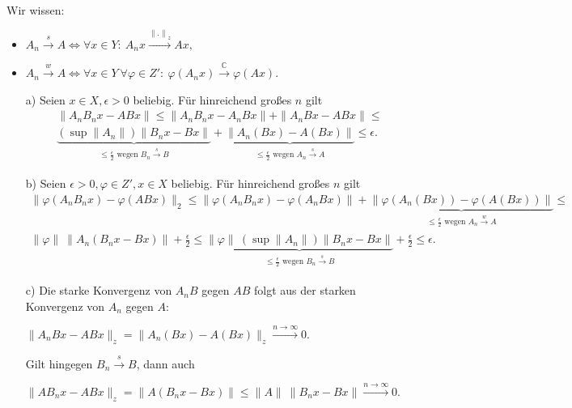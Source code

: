 \begin{solution}
\leavevmode \\
  Wir wissen:
\begin{itemize}
    \item $A_n \xrightarrow{s} A \Leftrightarrow \forall x \in Y:~ A_nx \xrightarrow{\mathbb{ \| . \|}_z} Ax,$
    \item $A_n \xrightarrow{w} A \Leftrightarrow \forall x \in Y~ \forall \varphi \in Z':~ \varphi(A_nx) \xrightarrow{\mathbb{C}} \varphi(Ax)$.
\end{itemize}

\begin{itemize}
    \item [a)] Seien $x \in X, \epsilon > 0$ beliebig. Für hinreichend großes $n$ gilt
    \begin{align*}
        \| A_n B_n x - ABx \| \leq \| A_n B_n x - A_n Bx \| + \| A_n Bx - ABx \| \leq \\
        \underbrace{(\sup{\| A_n \|}) \| B_n x - Bx \|}_{\substack{\leq
        \frac{\epsilon}{2}
        \text{~wegen~} B_n \xrightarrow{s} B}} +
        \underbrace{\| A_n(Bx) - A(Bx) \|}_{\substack{\leq \frac{\epsilon}{2} \text{~wegen~} A_n \xrightarrow{s} A}}
        \leq \epsilon.
    \end{align*}

    \item [b)] Seien $\epsilon > 0, \varphi \in Z', x \in X$ beliebig. Für hinreichend großes $n$ gilt
    \begin{align*}
        \| \varphi(A_n B_n x) - \varphi(ABx) \|_2
        \leq \| \varphi(A_n B_n x) - \varphi(A_nBx) \|
        +  \underbrace{\| \varphi(A_n (Bx)) - \varphi(A (Bx)) \|}_{\substack{\leq \frac{\epsilon}{2} \text{~wegen~} A_n \xrightarrow{w} A}} \leq \\
        \| \varphi \|~ \| A_n (B_n x - B x) \| + \frac{\epsilon}{2} \leq
        \underbrace{\| \varphi \|~ (\sup{\| A_n \|})
        \| B_n x - Bx \|}_{\substack{\leq \frac{\epsilon}{2} \text{~wegen~} B_n \xrightarrow{s} B}} + \frac{\epsilon}{2} \leq
        \epsilon.
    \end{align*}

    \item [c)]  Die starke Konvergenz von $A_nB$ gegen $AB$ folgt aus der starken Konvergenz von $A_n$ gegen $A$:
    \begin{center} $\| A_n Bx - ABx \|_z = \| A_n(Bx) - A(Bx) \|_z \xrightarrow{n \rightarrow \infty} 0.$ \end{center}
    Gilt hingegen $B_n \xrightarrow{s} B$, dann auch
    \begin{center}
     $\| AB_n x - ABx \|_z = \| A(B_n x - Bx) \| \leq
       \| A \|~ \| B_n x - Bx \| \xrightarrow{n \rightarrow \infty} 0.$
    \end{center}


\end{itemize}
\end{solution}
